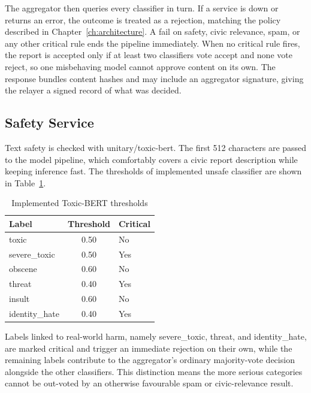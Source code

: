 The aggregator then queries every classifier in turn. If a service is down or returns an error, the outcome is treated as a rejection, matching the policy described in Chapter~\ref{ch:architecture}. A fail on safety, civic relevance, spam, or any other critical rule ends the pipeline immediately. When no critical rule fires, the report is accepted only if at least two classifiers vote accept and none vote reject, so one misbehaving model cannot approve content on its own. The response bundles content hashes and may include an aggregator signature, giving the relayer a signed record of what was decided.

\subsection{Safety Service}
\label{subsec:safety-service}

Text safety is checked with unitary/toxic-bert. The first 512 characters are passed to the model pipeline, which comfortably covers a civic report description while keeping inference fast. The thresholds of implemented unsafe classifier are shown in Table~\ref{tab:safety-thresholds}.

\begin{table}[!htbp]
    \centering
    \caption{Implemented Toxic-BERT thresholds}
    \label{tab:safety-thresholds}
    \small
    \begin{tabular}{l|c|l}
        
        Label & Threshold & Critical \\
        \hline
        toxic & 0.50 & No \\
        \hline
        severe\_toxic& 0.50 & Yes \\
        \hline
        obscene & 0.60 & No \\
        \hline
        threat & 0.40 & Yes \\
        \hline
        insult& 0.60 & No \\
        \hline
        identity\_hate & 0.40 & Yes \\
        
    \end{tabular}
\end{table}

Labels linked to real-world harm, namely severe\_toxic, threat, and identity\_hate, are marked critical and trigger an immediate rejection on their own, while the remaining labels contribute to the aggregator's ordinary majority-vote decision alongside the other classifiers. This distinction means the more serious categories cannot be out-voted by an otherwise favourable spam or civic-relevance result.

